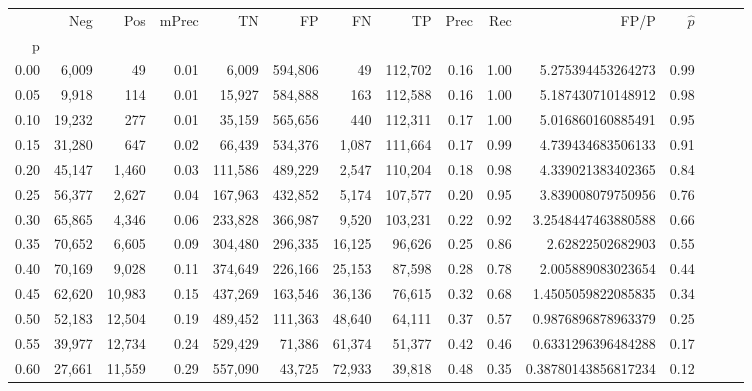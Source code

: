 \begin{tabular}{rrrrrrrrrrrrrrr}
\toprule
{} &     Neg &     Pos & mPrec &       TN &       FP &       FN &       TP &  Prec &   Rec &                  FP/P & $\hat{p}$ \\
p    &         &         &       &          &          &          &          &       &       &                       &           \\
\midrule
0.00 &   6,009 &      49 &  0.01 &    6,009 &  594,806 &       49 &  112,702 &  0.16 &  1.00 &     5.275394453264273 &      0.99 \\
0.05 &   9,918 &     114 &  0.01 &   15,927 &  584,888 &      163 &  112,588 &  0.16 &  1.00 &     5.187430710148912 &      0.98 \\
0.10 &  19,232 &     277 &  0.01 &   35,159 &  565,656 &      440 &  112,311 &  0.17 &  1.00 &     5.016860160885491 &      0.95 \\
0.15 &  31,280 &     647 &  0.02 &   66,439 &  534,376 &    1,087 &  111,664 &  0.17 &  0.99 &     4.739434683506133 &      0.91 \\
0.20 &  45,147 &   1,460 &  0.03 &  111,586 &  489,229 &    2,547 &  110,204 &  0.18 &  0.98 &     4.339021383402365 &      0.84 \\
0.25 &  56,377 &   2,627 &  0.04 &  167,963 &  432,852 &    5,174 &  107,577 &  0.20 &  0.95 &     3.839008079750956 &      0.76 \\
0.30 &  65,865 &   4,346 &  0.06 &  233,828 &  366,987 &    9,520 &  103,231 &  0.22 &  0.92 &    3.2548447463880588 &      0.66 \\
0.35 &  70,652 &   6,605 &  0.09 &  304,480 &  296,335 &   16,125 &   96,626 &  0.25 &  0.86 &      2.62822502682903 &      0.55 \\
0.40 &  70,169 &   9,028 &  0.11 &  374,649 &  226,166 &   25,153 &   87,598 &  0.28 &  0.78 &     2.005889083023654 &      0.44 \\
0.45 &  62,620 &  10,983 &  0.15 &  437,269 &  163,546 &   36,136 &   76,615 &  0.32 &  0.68 &    1.4505059822085835 &      0.34 \\
0.50 &  52,183 &  12,504 &  0.19 &  489,452 &  111,363 &   48,640 &   64,111 &  0.37 &  0.57 &    0.9876896878963379 &      0.25 \\
0.55 &  39,977 &  12,734 &  0.24 &  529,429 &   71,386 &   61,374 &   51,377 &  0.42 &  0.46 &    0.6331296396484288 &      0.17 \\
0.60 &  27,661 &  11,559 &  0.29 &  557,090 &   43,725 &   72,933 &   39,818 &  0.48 &  0.35 &   0.38780143856817234 &      0.12 \\

\end{tabular}
